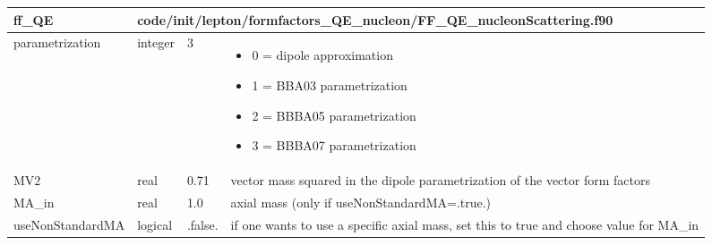 \documentclass{article}
\begin{document}

\begin{longtable}{llll}
\toprule
\textbf{\large{ff\_QE}} & \multicolumn{3}{l}{\footnotesize{code/init/lepton/formfactors\_QE\_nucleon/FF\_QE\_nucleonScattering.f90}}\\*
\midrule
\endfirsthead
\midrule
\endhead
parametrization & \begin{minipage}[t]{2cm}integer\end{minipage} & \begin{minipage}[t]{2cm}3\end{minipage} & \begin{minipage}[t]{12cm}\begin{itemize}\leftmargin0em\itemindent0pt\item 0 = dipole approximation\item 1 = BBA03 parametrization\item 2 = BBBA05 parametrization\item 3 = BBBA07 parametrization\end{itemize}\end{minipage}\\*
\midrule
MV2 & \begin{minipage}[t]{2cm}real\end{minipage} & \begin{minipage}[t]{2cm}0.71\end{minipage} & \begin{minipage}[t]{12cm}vector mass squared in the dipole parametrization of the vector form factors\end{minipage}\\*
\midrule
MA\_in & \begin{minipage}[t]{2cm}real\end{minipage} & \begin{minipage}[t]{2cm}1.0\end{minipage} & \begin{minipage}[t]{12cm}axial mass (only if useNonStandardMA=.true.)\end{minipage}\\*
\midrule
useNonStandardMA & \begin{minipage}[t]{2cm}logical\end{minipage} & \begin{minipage}[t]{2cm}.false.\end{minipage} & \begin{minipage}[t]{12cm}if one wants to use a specific axial mass, set this to true and choose value for MA\_in\end{minipage}\\*

\end{longtable}
\end{document}
